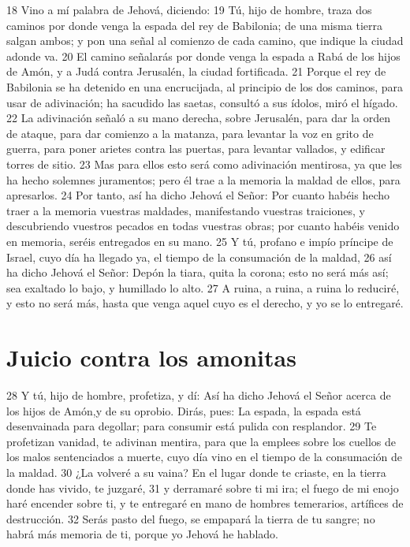 18 Vino a mí palabra de Jehová, diciendo:
19 Tú, hijo de hombre, traza dos caminos por donde venga la espada del rey de Babilonia; de una misma tierra salgan ambos; y pon una señal al comienzo de cada camino, que indique la ciudad adonde va.
20 El camino señalarás por donde venga la espada a Rabá de los hijos de Amón, y a Judá contra Jerusalén, la ciudad fortificada.
21 Porque el rey de Babilonia se ha detenido en una encrucijada, al principio de los dos caminos, para usar de adivinación; ha sacudido las saetas, consultó a sus ídolos, miró el hígado.
22 La adivinación señaló a su mano derecha, sobre Jerusalén, para dar la orden de ataque, para dar comienzo a la matanza, para levantar la voz en grito de guerra, para poner arietes contra las puertas, para levantar vallados, y edificar torres de sitio.
23 Mas para ellos esto será como adivinación mentirosa, ya que les ha hecho solemnes juramentos; pero él trae a la memoria la maldad de ellos, para apresarlos.
24 Por tanto, así ha dicho Jehová el Señor: Por cuanto habéis hecho traer a la memoria vuestras maldades, manifestando vuestras traiciones, y descubriendo vuestros pecados en todas vuestras obras; por cuanto habéis venido en memoria, seréis entregados en su mano.
25 Y tú, profano e impío príncipe de Israel, cuyo día ha llegado ya, el tiempo de la consumación de la maldad,
26 así ha dicho Jehová el Señor: Depón la tiara, quita la corona; esto no será más así; sea exaltado lo bajo, y humillado lo alto.
27 A ruina, a ruina, a ruina lo reduciré, y esto no será más, hasta que venga aquel cuyo es el derecho, y yo se lo entregaré.

\section*{Juicio contra los amonitas}

28 Y tú, hijo de hombre, profetiza, y dí: Así ha dicho Jehová el Señor acerca de los hijos de Amón,y de su oprobio. Dirás, pues: La espada, la espada está desenvainada para degollar; para consumir está pulida con resplandor.
29 Te profetizan vanidad, te adivinan mentira, para que la emplees sobre los cuellos de los malos sentenciados a muerte, cuyo día vino en el tiempo de la consumación de la maldad.
30 ¿La volveré a su vaina? En el lugar donde te criaste, en la tierra donde has vivido, te juzgaré,
31 y derramaré sobre ti mi ira; el fuego de mi enojo haré encender sobre ti, y te entregaré en mano de hombres temerarios, artífices de destrucción.
32 Serás pasto del fuego, se empapará la tierra de tu sangre; no habrá más memoria de ti, porque yo Jehová he hablado.


